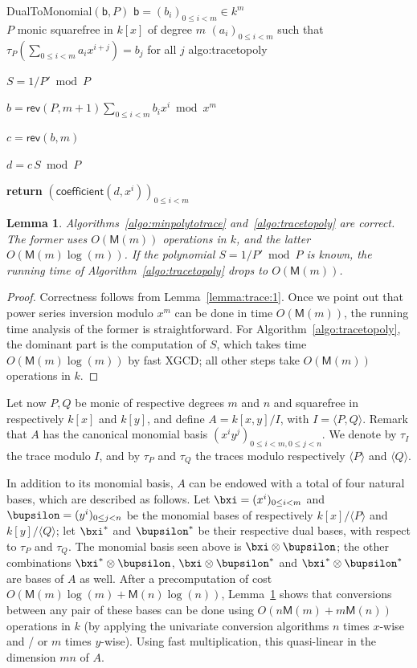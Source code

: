 \documentclass{sig-alternate}
\def\M {\ensuremath{\mathsf{M}}}
\def\vb {\ensuremath{\mathsf{b}}}
\def\coeff {\ensuremath{\mathsf{coefficient}}}
\def\rev {\ensuremath{\mathsf{rev}}}
\newcounter{algo}
\newenvironment{algorithm_endline}[4]{\small\begin{center}\begin{minipage}{0.48\textwidth}
      \refstepcounter{algo}
      \label{#4}
      \sf
      \rule{\textwidth}{0.2pt}\\
      \makebox[\textwidth][c]{Algorithm~\arabic{algo}:~\textbf{#1}}\\
      \rule[0.5\baselineskip]{\textwidth}{0.2pt}\\

      \vspace{-12pt}

      \parbox{\textwidth}{\textbf{Input} #2}
      \parbox{\textwidth}{\textbf{Output} #3}

\vspace{-7pt}

      \begin{enumerate*}}{\end{enumerate*}
      \vspace{-11pt}
      \rule{\textwidth}{0.2pt}
\end{minipage}\end{center}
}
\newcommand{\ang}[1]{\langle#1\rangle}
\newtheorem{Lemma}{Lemma}
\begin{document}
\begin{algorithm_endline}
{DualToMonomial$(\vb, P)$}
{$\vb=(b_i)_{0 \le i < m} \in k^m$\\ $P$ monic squarefree in $k[x]$ of degree $m$}
{$(a_i)_{0 \le i < m}$ such that $\tau_P(\sum_{0 \le i < m} a_i x^{i+j}) = b_j$ for all $j$}
{algo:tracetopoly}
\item $S = 1/P' \bmod P$
\item $b= \rev(P,m+1) \sum_{0 \le i < m} b_i x^i \bmod x^m$
\item $c= \rev(b, m)$
\item $d =c\, S \bmod P$
\item {\bf return} $(\coeff(d,x^i))_{0 \le i < m}$
\end{algorithm_endline}

\begin{Lemma}\label{lemma:uniconv}
  Algorithms~\ref{algo:minpolytotrace} and~\ref{algo:tracetopoly} are
  correct. The former uses $O(\M(m))$ operations in $k$, and the
  latter $O(\M(m)\log(m))$.  If the polynomial $S=1/P' \bmod P$ is
  known, the running time of Algorithm~\ref{algo:tracetopoly} drops to
  $O(\M(m))$.
\end{Lemma}
\begin{proof}
  Correctness follows from Lemma~\ref{lemma:trace:1}.  Once we point
  out that power series inversion modulo $x^m$ can be done in time
  $O(\M(m))$, the running time analysis of the former is
  straightforward. For Algorithm~\ref{algo:tracetopoly}, the dominant
  part is the computation of $S$, which takes time $O(\M(m)\log(m))$
  by fast XGCD; all other steps take $O(\M(m))$ operations in $k$.
\end{proof}

 Let now $P,Q$ be monic of
respective degrees $m$ and $n$ and squarefree in respectively $k[x]$
and $k[y]$, and define $A=k[x,y]/I$, with $I=\ang{P,Q}$. Remark that
$A$ has the canonical monomial basis $(x^i y^j)_{0 \le i <m, 0 \le j <
  n}$. %
We
denote by $\tau_I$ the trace modulo $I$, and by $\tau_P$ and $\tau_Q$
the traces modulo respectively $\ang{P}$ and $\ang{Q}$.

In addition to its monomial basis, $A$ can be endowed with a total of
four natural bases, which are described as follows. Let $\bxi=(x^i)_{0
  \le i < m}$ and $\bupsilon=(y^i)_{0 \le j < n}$ be the monomial
bases of respectively $k[x]/\ang{P}$ and $k[y]/\ang{Q}$; let
$\bxi^\ast$ and $\bupsilon^\ast$ be their respective dual bases, with
respect to $\tau_P$ and $\tau_Q$. The monomial basis seen above is
$\bxi \otimes \bupsilon$; the other combinations $\bxi^\ast \otimes
\bupsilon$, $\bxi \otimes \bupsilon^\ast$ and $\bxi^\ast \otimes
\bupsilon^\ast$ are bases of $A$ as well. After a precomputation of
cost $O(\M(m)\log(m) + \M(n)\log(n))$, Lemma~\ref{lemma:uniconv} shows
that conversions between any pair of these bases can be done using
$O(n\M(m)+m\M(n))$ operations in $k$ (by applying the univariate
conversion algorithms $n$ times $x$-wise and / or $m$ times
$y$-wise). Using fast multiplication, this quasi-linear in the
dimension $mn$ of $A$.
\end{document}
